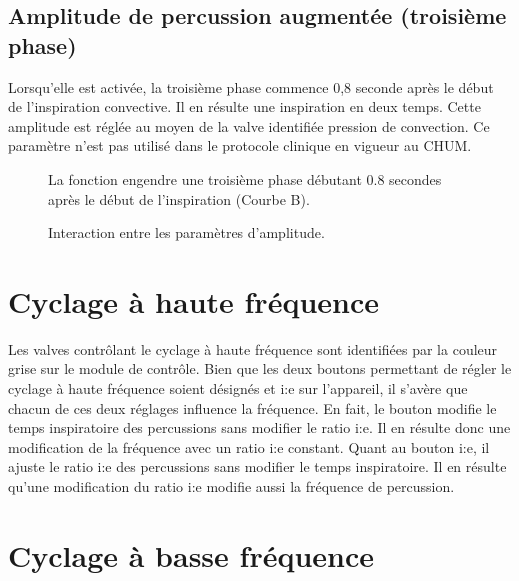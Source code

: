 \subsection{Amplitude de percussion augmentée (troisième phase)}

Lorsqu'elle est activée, la troisième phase commence 0,8 seconde après
	le début de l'inspiration convective. Il en résulte une inspiration
	en deux temps. Cette amplitude est réglée au moyen de la valve
	identifiée pression de convection. Ce paramètre n'est pas utilisé
	dans le protocole clinique en vigueur au CHUM.

	\begin{figure}
		\begin{wide}
		
		\caption[Augmentation de la pression de convection]{La fonction
			 engendre une
			troisième phase débutant 0.8 secondes après le début de
		l'inspiration (Courbe B).}

		
		\caption{Interaction entre les paramètres d'amplitude.}
		\label{figinterampl}
	\end{wide}
	\end{figure}

\section{Cyclage à haute fréquence}

Les valves contrôlant le cyclage à haute fréquence sont identifiées
	par la couleur grise sur le module de contrôle.  Bien que les deux
	boutons permettant de régler le cyclage à haute fréquence soient
	désignés  et  i:e sur
	l'appareil, il s'avère que chacun de ces deux  réglages
	influence la fréquence.  En fait, le bouton  modifie le temps inspiratoire des percussions sans
	modifier le ratio i:e. Il en résulte donc une modification de la
	fréquence avec un ratio i:e constant.  Quant au bouton 
	i:e, il ajuste le ratio i:e des percussions sans modifier le temps
	inspiratoire. Il en résulte qu’une modification du ratio i:e modifie
	aussi la fréquence de percussion.

\section{Cyclage à basse fréquence}

